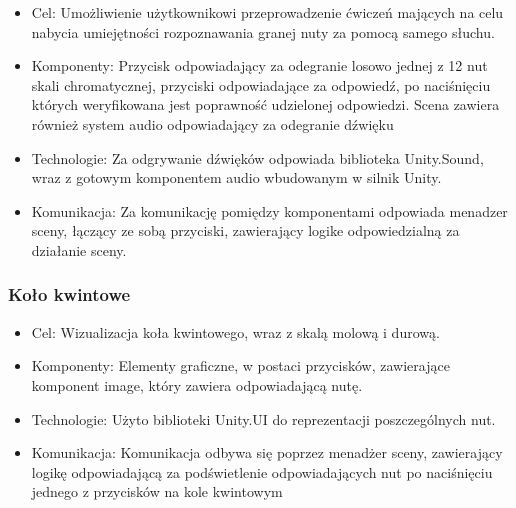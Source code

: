 \begin{itemize}
\item Cel: Umożliwienie użytkownikowi przeprowadzenie ćwiczeń mających na celu nabycia umiejętności rozpoznawania granej nuty za pomocą samego słuchu.
\item Komponenty: Przycisk odpowiadający za odegranie losowo jednej z 12 nut skali chromatycznej, przyciski odpowiadające za odpowiedź, po naciśnięciu których weryfikowana jest poprawność udzielonej odpowiedzi. Scena zawiera również system audio odpowiadający za odegranie dźwięku
\item Technologie: Za odgrywanie dźwięków odpowiada biblioteka Unity.Sound, wraz z gotowym komponentem audio wbudowanym w silnik Unity.
\item Komunikacja: Za komunikację pomiędzy komponentami odpowiada menadzer sceny, łączący ze sobą przyciski, zawierający logike odpowiedzialną za działanie sceny.
\end{itemize}

\subsubsection{Koło kwintowe}

\begin{itemize}
	\item Cel: Wizualizacja koła kwintowego, wraz z skalą molową i durową.
	\item Komponenty: Elementy graficzne, w postaci przycisków, zawierające komponent image, który zawiera odpowiadającą nutę.
	\item Technologie: Użyto biblioteki Unity.UI do reprezentacji poszczególnych nut.
	\item Komunikacja: Komunikacja odbywa się poprzez menadżer sceny, zawierający logikę odpowiadającą za podświetlenie odpowiadających nut po naciśnięciu jednego z przycisków na kole kwintowym
\end{itemize}
